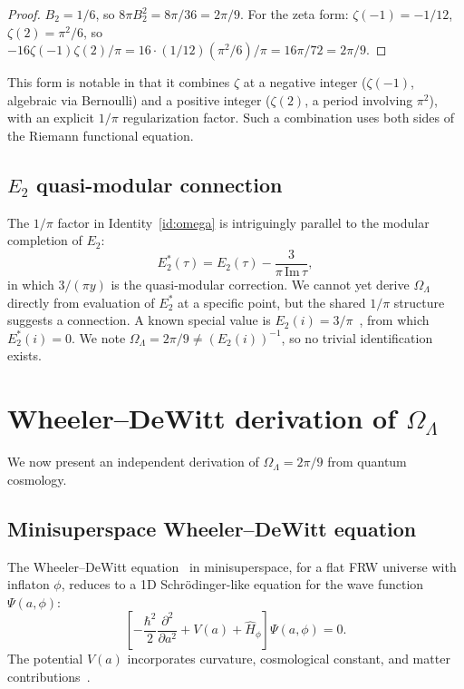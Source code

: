 \documentclass[11pt,a4paper]{article}
\begin{document}
\begin{proof}
$B_2 = 1/6$, so $8\pi B_2^2 = 8\pi/36 = 2\pi/9$. For the
zeta form: $\zeta(-1) = -1/12$, $\zeta(2) = \pi^2/6$, so
$-16\zeta(-1)\zeta(2)/\pi = 16 \cdot (1/12)(π^2/6)/\pi = 16\pi/72 = 2\pi/9$.
\end{proof}

This form is notable in that it combines $\zeta$ at a negative integer
($\zeta(-1)$, algebraic via Bernoulli) and a positive integer
($\zeta(2)$, a period involving $\pi^2$), with an explicit $1/\pi$
regularization factor. Such a combination uses both sides of the
Riemann functional equation.

\subsection{$E_2$ quasi-modular connection}

The $1/\pi$ factor in Identity~\ref{id:omega} is intriguingly parallel
to the modular completion of $E_2$:
\begin{equation}
E_2^*(\tau) = E_2(\tau) - \frac{3}{\pi\,\mathrm{Im}\,\tau},
\end{equation}
in which $3/(\pi y)$ is the quasi-modular correction. We cannot yet
derive $\Omega_\Lambda$ directly from evaluation of $E_2^*$ at a
specific point, but the shared $1/\pi$ structure suggests a connection.
A known special value is $E_2(i) = 3/\pi$~\cite{Serre1973}, from which
$E_2^*(i) = 0$. We note $\Omega_\Lambda = 2\pi/9 \neq (E_2(i))^{-1}$,
so no trivial identification exists.

\section{Wheeler--DeWitt derivation of $\Omega_\Lambda$}
\label{sec:wdw}

We now present an independent derivation of $\Omega_\Lambda = 2\pi/9$
from quantum cosmology.

\subsection{Minisuperspace Wheeler--DeWitt equation}

The Wheeler--DeWitt equation~\cite{DeWitt1967,Wheeler1968} in
minisuperspace, for a flat FRW universe with inflaton $\phi$, reduces
to a 1D Schr\"odinger-like equation for the wave function $\Psi(a,\phi)$:
\begin{equation}
\left[-\frac{\hbar^2}{2}\frac{\partial^2}{\partial a^2} + V(a) + \hat H_\phi\right]\Psi(a,\phi) = 0.
\end{equation}
The potential $V(a)$ incorporates curvature, cosmological constant, and
matter contributions~\cite{Halliwell1990}.
\end{document}
